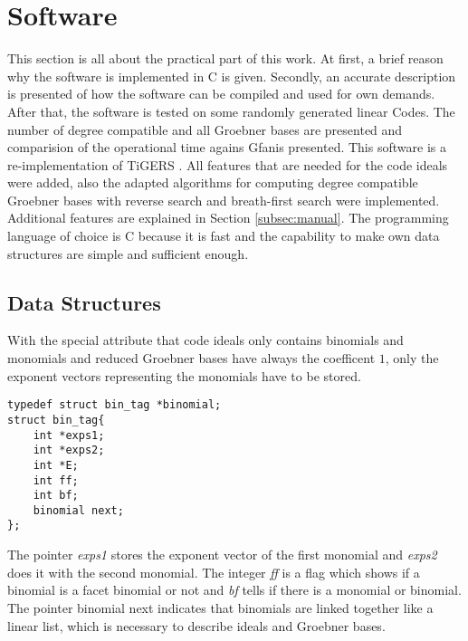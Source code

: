 \section{Software}
\label{sec:software}
This section is all about the practical part of this work. At first, a brief reason why the software is implemented in C is given. Secondly, an accurate description is presented of how the software can be compiled and used for own demands.
After that, the software is tested on some randomly generated linear Codes. The number of degree compatible and all Groebner bases are presented and comparision of the operational time agains Gfan\cite{gfan}is presented.   \newline
This software is a re-implementation of TiGERS \cite{tigers}. All features that are needed for the code ideals were added, also the adapted algorithms for computing degree compatible Groebner bases with reverse search and breath-first search were implemented.   
Additional features are explained in Section \ref{subsec:manual}.
The programming language of choice is C because it is fast and the capability to make own data structures are simple and sufficient enough.

\subsection{Data Structures}
\label{subsec:datastructure}
With the special attribute that code ideals only contains binomials and monomials and reduced Groebner bases have always the coefficent $1$, only the exponent vectors representing the monomials have to be stored.


\begin{lstlisting} 
typedef struct bin_tag *binomial;
struct bin_tag{
    int *exps1;
    int *exps2;
    int *E;
    int ff;
    int bf;
    binomial next;
};

\end{lstlisting}

The pointer \emph{exps1} stores the exponent vector of the first monomial and \emph{exps2} does it with the second monomial.
The integer \emph{ff} is a flag which shows if a binomial is a facet binomial or not and \emph{bf} tells if there is a monomial or binomial.
The pointer binomial next indicates that binomials are linked together like a linear list, which is necessary to describe ideals and Groebner bases.\\

